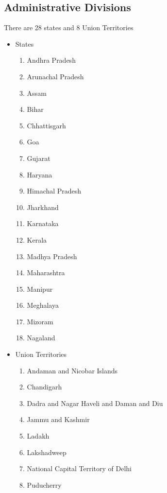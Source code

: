 \documentclass[12pt,a4paper]{article}
\begin{document}
\subsection{Administrative Divisions}
There are 28 states and 8 Union Territories
\begin{itemize}
	\item States
	\begin{enumerate}
		\item Andhra Pradesh
		\item Arunachal Pradesh
		\item Assam
		\item Bihar
		\item Chhattisgarh
		\item Goa
		\item Gujarat
		\item Haryana
		\item Himachal Pradesh
		\item Jharkhand
		\item Karnataka
		\item Kerala
		\item Madhya Pradesh
		\item Maharashtra
		\item Manipur
		\item Meghalaya
		\item Mizoram
		\item Nagaland	
	\end{enumerate}
	\item Union Territories
	\begin{enumerate}[label= (\Alph*)]
		\item Andaman and Nicobar Islands
		\item Chandigarh
		\item Dadra and Nagar Haveli and Daman and Diu
		\item Jammu and Kashmir
		\item Ladakh
		\item Lakshadweep
		\item National Capital Territory of Delhi
		\item Puducherry
	\end{enumerate}
\end{itemize}
\end{document}
